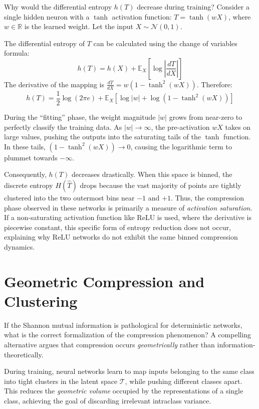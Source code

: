 Why would the differential entropy $h(T)$ decrease during training? Consider a single hidden neuron with a $\tanh$ activation function: $T = \tanh(w X)$, where $w \in \mathbb{R}$ is the learned weight. Let the input $X \sim \mathcal{N}(0, 1)$.

The differential entropy of $T$ can be calculated using the change of variables formula:
\[
h(T) = h(X) + \mathbb{E}_{X}\left[ \log \left| \frac{dT}{dX} \right| \right]
\]
The derivative of the mapping is $\frac{dT}{dX} = w (1 - \tanh^2(wX))$. Therefore:
\[
h(T) = \frac{1}{2}\log(2\pi e) + \mathbb{E}_{X}\left[ \log |w| + \log(1 - \tanh^2(wX)) \right]
\]

During the ``fitting'' phase, the weight magnitude $|w|$ grows from near-zero to perfectly classify the training data. As $|w| \to \infty$, the pre-activation $wX$ takes on large values, pushing the outputs into the saturating tails of the $\tanh$ function. In these tails, $(1 - \tanh^2(wX)) \to 0$, causing the logarithmic term to plummet towards $-\infty$. 

Consequently, $h(T)$ decreases drastically. When this space is binned, the discrete entropy $H(\hat{T})$ drops because the vast majority of points are tightly clustered into the two outermost bins near $-1$ and $+1$. Thus, the compression phase observed in these networks is primarily a measure of \emph{activation saturation}. If a non-saturating activation function like ReLU is used, where the derivative is piecewise constant, this specific form of entropy reduction does not occur, explaining why ReLU networks do not exhibit the same binned compression dynamics.

\section{Geometric Compression and Clustering}

If the Shannon mutual information is pathological for deterministic networks, what is the correct formalization of the compression phenomenon? A compelling alternative argues that compression occurs \emph{geometrically} rather than information-theoretically.

During training, neural networks learn to map inputs belonging to the same class into tight clusters in the latent space $\mathcal{T}$, while pushing different classes apart. This reduces the \emph{geometric volume} occupied by the representations of a single class, achieving the goal of discarding irrelevant intraclass variance.

